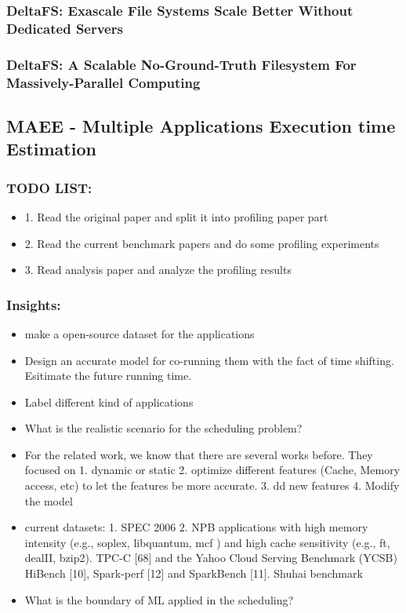 \documentclass[UTF8]{article}
\begin{document}
\subsubsection{DeltaFS: Exascale File Systems Scale Better Without Dedicated Servers}
\subsubsection{DeltaFS: A Scalable No-Ground-Truth Filesystem For Massively-Parallel Computing}

\subsection{MAEE - Multiple Applications Execution time Estimation}
\subsubsection{TODO LIST:}
\begin{itemize}
    \item 1. Read the original paper and split it into profiling paper part
    \item 2. Read the current benchmark papers and do some profiling experiments
    \item 3. Read analysis paper and analyze the profiling results
\end{itemize}
\subsubsection{Insights:}
\begin{itemize}
	\item make a open-source dataset for the applications 
	\item Design an accurate model for co-running them with the fact of time shifting. Esitimate the future running time.
	\item Label different kind of applications
	\item What is the realistic scenario for the scheduling problem?
    \item For the related work, we know that there are several works before. They focused on 1. dynamic or static 2. optimize different features (Cache, Memory access, etc) to let the features be more accurate. 3. dd new features 4. Modify the model
    \item current datasets: 1. SPEC 2006 2. NPB applications with high memory intensity (e.g., soplex, libquantum, mcf ) and high cache sensitivity (e.g., ft, dealII, bzip2). TPC-C [68] and the Yahoo Cloud Serving Benchmark (YCSB) HiBench [10], Spark-perf [12] and SparkBench [11]. Shuhai benchmark
    \item What is the boundary of ML applied in the scheduling?
\end{itemize}
\end{document}

